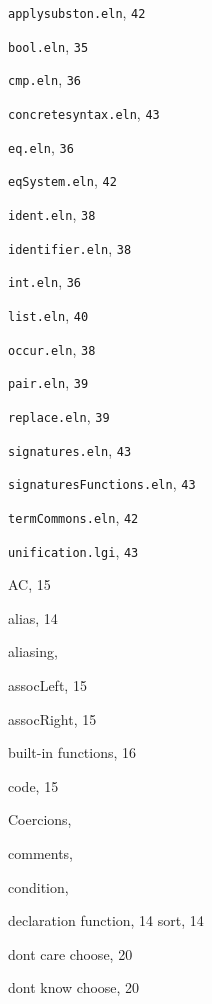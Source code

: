 \begin{theindex}

  \item {\tt  applysubston.eln}, \tt{42}
  \item {\tt  bool.eln}, \tt{35}
  \item {\tt  cmp.eln}, \tt{36}
  \item {\tt  concretesyntax.eln}, \tt{43}
  \item {\tt  eq.eln}, \tt{36}
  \item {\tt  eqSystem.eln}, \tt{42}
  \item {\tt  ident.eln}, \tt{38}
  \item {\tt  identifier.eln}, \tt{38}
  \item {\tt  int.eln}, \tt{36}
  \item {\tt  list.eln}, \tt{40}
  \item {\tt  occur.eln}, \tt{38}
  \item {\tt  pair.eln}, \tt{39}
  \item {\tt  replace.eln}, \tt{39}
  \item {\tt  signatures.eln}, \tt{43}
  \item {\tt  signaturesFunctions.eln}, \tt{43}
  \item {\tt  termCommons.eln}, \tt{42}
  \item {\tt  unification.lgi}, \tt{43}

  \indexspace

  \item AC, 15
  \item alias, 14
  \item aliasing, 
  \item assocLeft, 15
  \item assocRight, 15

  \indexspace

  \item built-in
    \subitem functions, 16

  \indexspace

  \item code, 15
  \item Coercions, 
  \item comments, 
  \item condition, 

  \indexspace

  \item declaration
    \subitem function, 14
    \subitem sort, 14
  \item dont care choose, 20
  \item dont know choose, 20


\end{theindex}
